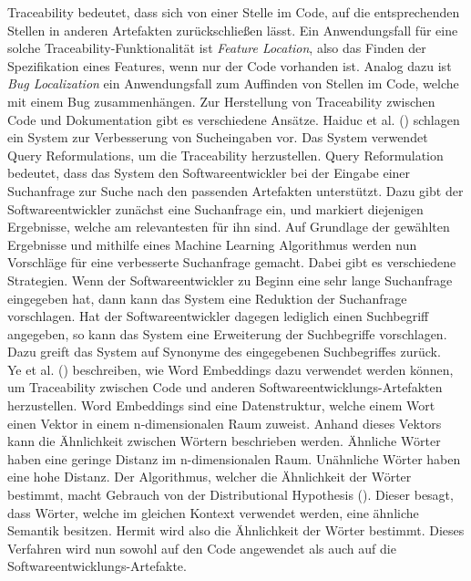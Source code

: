 Traceability bedeutet, dass sich von einer Stelle im Code, auf die entsprechenden Stellen in anderen Artefakten zurückschließen lässt.
Ein Anwendungsfall für eine solche Traceability-Funktionalität ist \textit{Feature Location}, also das Finden der Spezifikation eines Features, wenn nur der Code vorhanden ist.
Analog dazu ist \textit{Bug Localization} ein Anwendungsfall zum Auffinden von Stellen im Code, welche mit einem Bug zusammenhängen.
Zur Herstellung von Traceability zwischen Code und Dokumentation gibt es verschiedene Ansätze.
Haiduc et al. (\citeyear{Haiduc_Bavota_Marcus_Oliveto_DeLucia_Menzies_2013}) schlagen ein System zur Verbesserung von Sucheingaben vor.
Das System verwendet Query Reformulations, um die Traceability herzustellen.
Query Reformulation bedeutet, dass das System den Softwareentwickler bei der Eingabe einer Suchanfrage zur Suche nach den passenden Artefakten unterstützt.
Dazu gibt der Softwareentwickler zunächst eine Suchanfrage ein, und markiert diejenigen Ergebnisse, welche am relevantesten für ihn sind.
Auf Grundlage der gewählten Ergebnisse und mithilfe eines Machine Learning Algorithmus werden nun Vorschläge für eine verbesserte Suchanfrage gemacht.
Dabei gibt es verschiedene Strategien.
Wenn der Softwareentwickler zu Beginn eine sehr lange Suchanfrage eingegeben hat, dann kann das System eine Reduktion der Suchanfrage vorschlagen.
Hat der Softwareentwickler dagegen lediglich einen Suchbegriff angegeben, so kann das System eine Erweiterung der Suchbegriffe vorschlagen.
Dazu greift das System auf Synonyme des eingegebenen Suchbegriffes zurück.\\

Ye et al. (\citeyear{Ye_Shen_Ma_Bunescu_Liu_2016}) beschreiben, wie Word Embeddings dazu verwendet werden können, um Traceability zwischen Code und anderen Softwareentwicklungs-Artefakten herzustellen.
Word Embeddings sind eine Datenstruktur, welche einem Wort einen Vektor in einem n-dimensionalen Raum zuweist.
Anhand dieses Vektors kann die Ähnlichkeit zwischen Wörtern beschrieben werden.
Ähnliche Wörter haben eine geringe Distanz im n-dimensionalen Raum.
Unähnliche Wörter haben eine hohe Distanz.
Der Algorithmus, welcher die Ähnlichkeit der Wörter bestimmt, macht Gebrauch von der Distributional Hypothesis (\cite{Harris_1954}).
Dieser besagt, dass Wörter, welche im gleichen Kontext verwendet werden, eine ähnliche Semantik besitzen.
Hermit wird also die Ähnlichkeit der Wörter bestimmt.
Dieses Verfahren wird nun sowohl auf den Code angewendet als auch auf die Softwareentwicklungs-Artefakte.\\

